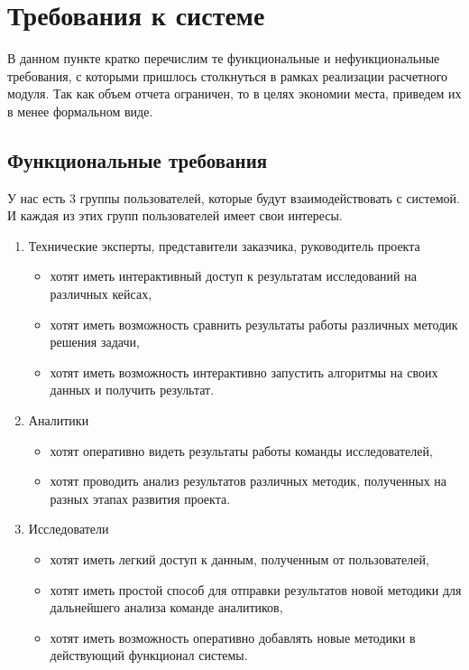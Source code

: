 \section*{\Large{Требования к системе}}

В данном пункте кратко перечислим те функциональные и нефункциональные требования, с которыми пришлось столкнуться
в рамках реализации расчетного модуля. Так как объем отчета ограничен, то в целях экономии места, приведем их в менее
формальном виде.

\subsection*{\large{Функциональные требования}}

У нас есть 3 группы пользователей, которые будут взаимодействовать с системой.
И каждая из этих групп пользователей имеет свои интересы.

\begin{enumerate}
    \item Технические эксперты, представители заказчика, руководитель проекта
    \begin{itemize}
        \item хотят иметь интерактивный доступ к результатам исследований на различных кейсах,
        \item хотят иметь возможность сравнить результаты работы различных методик решения задачи,
        \item хотят иметь возможность интерактивно запустить алгоритмы на своих данных и получить результат.
    \end{itemize}
    \item Аналитики
    \begin{itemize}
        \item хотят оперативно видеть результаты работы команды исследователей,
        \item хотят проводить анализ результатов различных методик, полученных на разных этапах развития проекта.
    \end{itemize}
    \item Исследователи
    \begin{itemize}
        \item хотят иметь легкий доступ к данным, полученным от пользователей,
        \item хотят иметь простой способ для отправки результатов новой методики для
дальнейшего анализа команде аналитиков,
        \item хотят иметь возможность оперативно добавлять новые методики в действующий
функционал системы.
    \end{itemize}
\end{enumerate}

